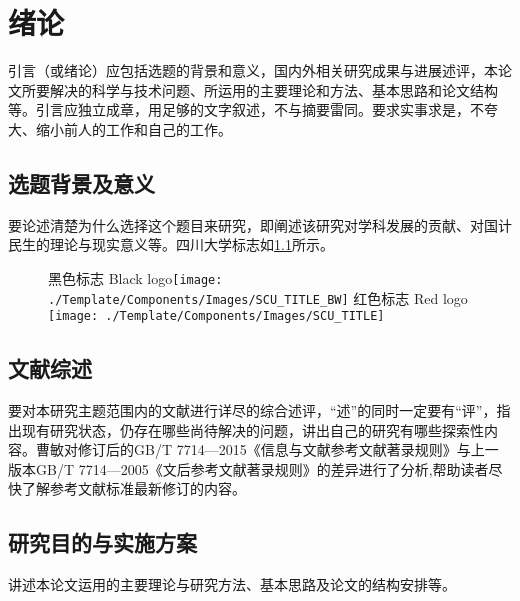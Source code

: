 
\chapter{绪论}%
引言（或绪论）应包括选题的背景和意义，国内外相关研究成果与进展述评，本论文所要解决的科学与技术问题、所运用的主要理论和方法、基本思路和论文结构等。引言应独立成章，用足够的文字叙述，不与摘要雷同。要求实事求是，不夸大、缩小前人的工作和自己的工作。
\section{选题背景及意义}
要论述清楚为什么选择这个题目来研究，即阐述该研究对学科发展的贡献、对国计民生的理论与现实意义等。四川大学标志如\cref{fig:test}所示。
\begin{figure}[!htb]
    \centering
    \bisubcaptionbox
    {黑色标志\label{fig:test:A}}
    {Black logo}{\texttt{[image: ./Template/Components/Images/SCU\_TITLE\_BW]}}%
    \qquad
    \bisubcaptionbox
    {红色标志\label{fig:test:B}}
    {Red logo}{ \texttt{[image: ./Template/Components/Images/SCU\_TITLE]}}%
    \label{fig:test}
    \end{figure}
\section{文献综述}
要对本研究主题范围内的文献进行详尽的综合述评，“述”的同时一定要有“评”，指出现有研究状态，仍存在哪些尚待解决的问题，讲出自己的研究有哪些探索性内容。曹敏\cite{曹敏GB}对修订后的GB/T 7714—2015《信息与文献参考文献著录规则》与上一版本GB/T 7714—2005《文后参考文献著录规则》的差异进行了分析,帮助读者尽快了解参考文献标准最新修订的内容。
\section{研究目的与实施方案}
讲述本论文运用的主要理论与研究方法、基本思路及论文的结构安排等。

